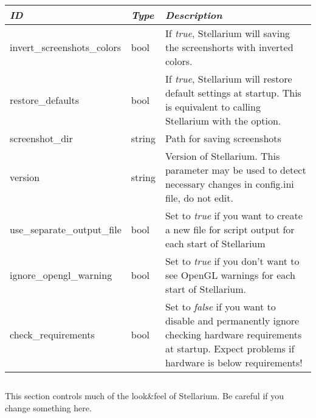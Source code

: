 \begin{longtabu} to \textwidth {l|l|X}\toprule
\emph{ID}                 & \emph{Type} & \emph{Description}\\\midrule
invert\_screenshots\_colors & bool   & If \emph{true}, Stellarium will saving the screenshorts with inverted colors.\\\midrule
restore\_defaults           & bool   & If \emph{true}, Stellarium will restore default settings at startup. 
                                       This is equivalent to calling Stellarium with the  option.\\\midrule
screenshot\_dir             & string & Path for saving screenshots\\\midrule
version                     & string & Version of Stellarium. This parameter may be used to detect necessary changes in config.ini file, do not edit.\\\midrule
use\_separate\_output\_file & bool   & Set to \emph{true} if you want to create a new file for script output for each start of Stellarium\\\midrule
ignore\_opengl\_warning     & bool   & Set to \emph{true} if you don't want to see OpenGL warnings for each start of Stellarium.\\\midrule
check\_requirements         & bool   & Set to \emph{false} if you want to disable and permanently ignore checking hardware requirements at startup. 
                                       Expect problems if hardware is below requirements!\\
\bottomrule
\end{longtabu}

\subsection{}\label{sec:config.ini:navigation}

This section controls much of the look\&feel of Stellarium. Be careful if you change something here.


